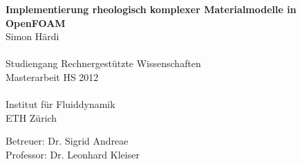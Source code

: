 \begin{titlepage}
\begin{center}
    \vspace*{1cm}
    {\huge \bfseries Implementierung rheologisch komplexer Materialmodelle in OpenFOAM\\}
    \vspace{2cm}
    {\large 
        Simon Härdi\\
	~\\
	Studiengang Rechnergestützte Wissenschaften\\
	\vspace{3.5cm}
	Masterarbeit HS 2012\\
	~\\
	Institut für Fluiddynamik\\
	ETH Zürich\\
    }




{\large
	Betreuer: Dr. Sigrid Andreae\\[\baselineskip]
	Professor: Dr. Leonhard Kleiser
}
\end{center}

\vspace*{2cm}

\end{titlepage}
